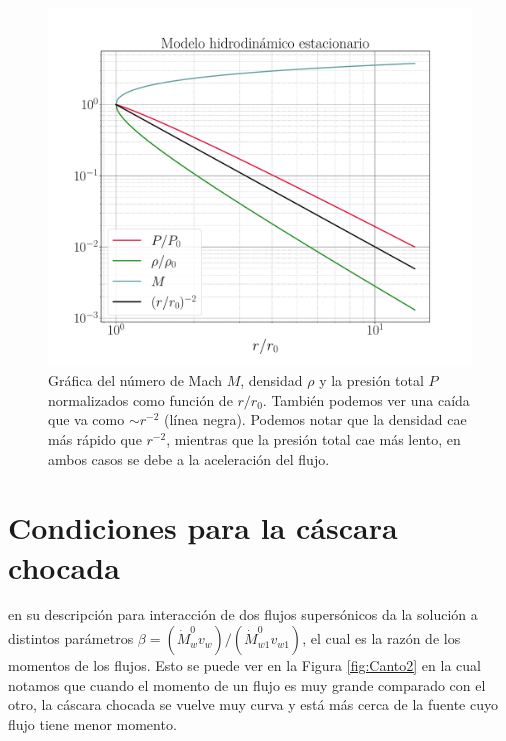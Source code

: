\documentclass{book}
\begin{document}
\begin{figure}[htb]
    \centering    \includegraphics[width=\textwidth]{Nuevas imagenes finales/C2_estructura.pdf}
    \caption{Gráfica del número de Mach $M$, densidad $\rho$ y la presión total $P$ normalizados como función de $r/r_0$. También podemos ver una caída que va como $\sim r^{-2}$ (línea negra). Podemos notar que la densidad cae más rápido que $r^{-2}$, mientras que la presión total cae más lento, en ambos casos se debe a la aceleración del flujo.
    }
    \label{fig:grafica_C2}
\end{figure}

\section{Condiciones para la cáscara chocada}

\cite{Canto:1996} en su descripción para interacción de dos flujos supersónicos da la solución a distintos parámetros $\beta=(\dot{M}^0_w v_w)/(\dot{M}^0_{w1}v_{w1})$, el cual es la razón de los momentos de los flujos. Esto se puede ver en la Figura \ref{fig:Canto2} en la cual notamos que cuando el momento de un flujo es muy  grande comparado con el otro, la cáscara chocada se vuelve muy curva y está más cerca de la fuente cuyo flujo tiene menor momento.
\end{document}
